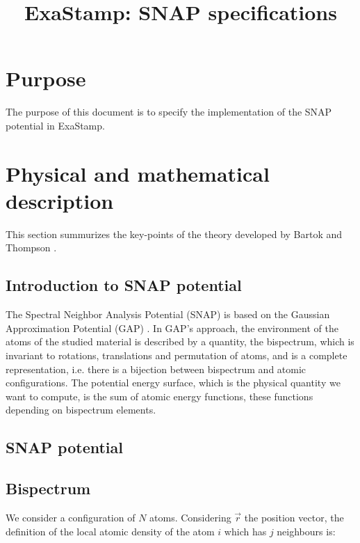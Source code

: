 \documentclass[12pt]{article}
\title{ExaStamp: SNAP specifications}
\begin{document}
  \newcommand{\spec}[1]{\colorbox{green!60}{\texttt{\detokenize{#1}}}} %
  \newcommand{\chk}[1]{\colorbox{blue!60}{\texttt{\detokenize{#1}}}} %
  \newcommand{\todo}{\colorbox{red!60}{TODO}}

  \maketitle

  \section{Purpose}

  The purpose of this document is to specify the implementation of the SNAP potential \cite{Thompson_01} in ExaStamp.

  \section{Physical and mathematical description}
  This section summurizes the key-points of the theory developed by Bartok \cite{Bartok_01} and Thompson \cite{Thompson_01}.

  \subsection{Introduction to SNAP potential}
  The Spectral Neighbor Analysis Potential (SNAP) \cite{Thompson_01} is based on the Gaussian Approximation Potential (GAP) \cite{Bartok_01}. 
  In GAP's approach, the environment of the atoms of the studied material is described by a quantity, the bispectrum, which is invariant to rotations,
  translations and permutation of atoms, and is a complete representation, i.e. there is a bijection between bispectrum and atomic configurations. 
  The potential energy surface,  which is the physical quantity we want to compute, is the sum of atomic energy functions, these functions depending 
  on bispectrum elements. \\

  \subsection{SNAP potential}

  \subsection{Bispectrum}
  We consider a configuration of $N$ atoms. Considering $\vec{r}$ the position vector, the definition of the local atomic density of the atom $i$ which has $j$ neighbours is:
\end{document}
